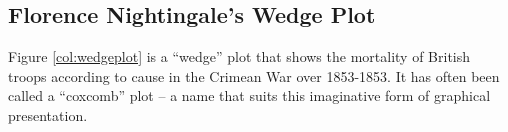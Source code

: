 % 
% 

\newpage
\subsection*{Florence Nightingale's Wedge Plot}\label{sec:wedge}


Figure \ref{col:wedgeplot} is a ``wedge'' plot that shows the
mortality of British troops according to cause in the Crimean War over
1853-1853. It has often been called a ``coxcomb'' plot -- a name that
suits this imaginative form of graphical presentation.


